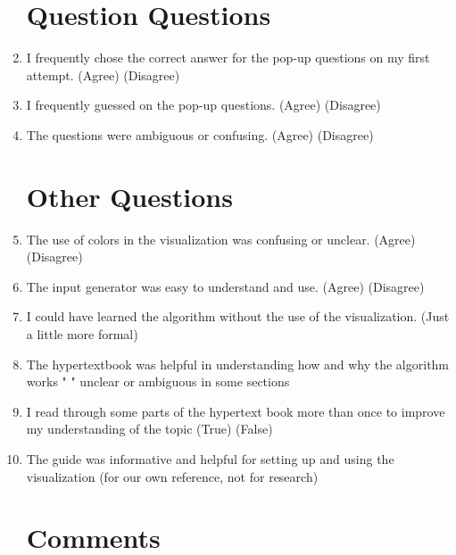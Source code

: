 \documentclass{article}
\begin{document}
\begin{enumerate}
\section*{Question Questions}

\item I frequently chose  the correct answer for the pop-up questions on my first attempt.
(Agree) (Disagree)

\item I frequently guessed on the pop-up questions.
(Agree) (Disagree)

\item The questions were ambiguous or confusing.
(Agree) (Disagree)

\section*{Other Questions}

\item The use of colors in the visualization was confusing or unclear.
(Agree) (Disagree) %

\item The input generator was easy to understand and use.
(Agree) (Disagree)


\item I could have learned the algorithm without the use of the visualization.
(Just a little more formal)

\item The hypertextbook was helpful in understanding how and why the algorithm works
"                   " unclear or ambiguous in some sections

\item I read through some parts of the hypertext book more than once to improve my understanding of the topic (True) (False)

\item The guide was informative and helpful for setting up and using the visualization (for our own reference, not for research) %

\section*{Comments}


\end{enumerate}
\end{document}
